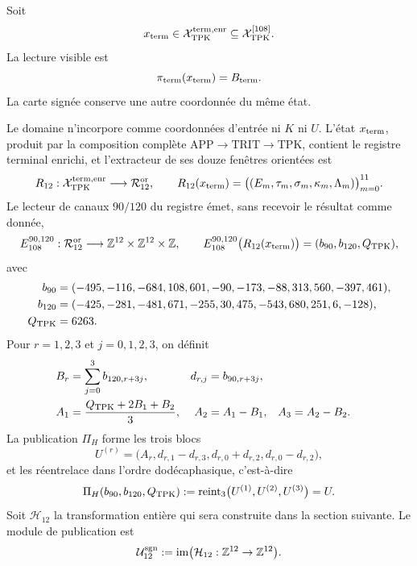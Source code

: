 Soit
\[
 x_{\rm term}\in
 \mathcal X_{\rm TPK}^{\rm term,enr}
 \subseteq\mathcal X_{\rm TPK}^{[108]}.
\]
La lecture visible est
\[
 \pi_{\rm term}(x_{\rm term})=B_{\rm term}.
\]
La carte signée conserve une autre coordonnée du même état.

\begin{definition}
\label{p3-83-c25-s4:def:subespacio-firmado-terminal}
Le domaine n’incorpore comme coordonnées d’entrée ni \(K\) ni \(U\).
L’état \(x_{\rm term}\), produit par la composition complète
\(\mathrm{APP}\to\mathrm{TRIT}\to\mathrm{TPK}\), contient le registre
terminal enrichi, et l’extracteur de ses douze fenêtres orientées est
\begin{equation}
 R_{12}:\mathcal X_{\rm TPK}^{\rm term,enr}
 \longrightarrow\mathcal R_{12}^{\rm or},
 \qquad
 R_{12}(x_{\rm term})
 =\bigl((E_m,\tau_m,\sigma_m,\kappa_m,\Lambda_m)\bigr)_{m=0}^{11}.
 \label{p3-83-c25-s4:eq:subespacio-firmado-terminal}
\end{equation}
Le lecteur de canaux \(90/120\) du registre émet, sans recevoir le résultat
comme donnée,
\[
 E_{108}^{90,120}:\mathcal R_{12}^{\rm or}
 \longrightarrow\mathbb Z^{12}\times\mathbb Z^{12}\times\mathbb Z,
 \qquad
 E_{108}^{90,120}\bigl(R_{12}(x_{\rm term})\bigr)
 =(b_{90},b_{120},Q_{\rm TPK}),
\]
avec
\begin{align*}
 b_{90}={}&(-495,-116,-684,108,601,-90,
             -173,-88,313,560,-397,461),\\
 b_{120}={}&(-425,-281,-481,671,-255,30,
              475,-543,680,251,6,-128),\\
 Q_{\rm TPK}={}&6263.
\end{align*}
Pour \(r=1,2,3\) et \(j=0,1,2,3\), on définit
\[
\begin{aligned}
 B_r&=\sum_{j=0}^{3}b_{120,r+3j},
 &d_{r,j}&=b_{90,r+3j},\\
 A_1&=\frac{Q_{\rm TPK}+2B_1+B_2}{3},
 &A_2&=A_1-B_1,
 &A_3&=A_2-B_2.
\end{aligned}
\]
La publication \(\Pi_H\) forme les trois blocs
\[
 U^{(r)}=
 \bigl(A_r,d_{r,1}-d_{r,3},d_{r,0}+d_{r,2},
 d_{r,0}-d_{r,2}\bigr),
\]
et les réentrelace dans l’ordre dodécaphasique, c’est-à-dire
\[
 \Pi_H(b_{90},b_{120},Q_{\rm TPK})
 :=\operatorname{reint}_3\bigl(U^{(1)},U^{(2)},U^{(3)}\bigr)=U.
\]
Soit \(\mathcal H_{12}\) la
transformation entière qui sera construite dans la section suivante. Le module
de publication est
\begin{equation}
 \mathcal U_{12}^{\rm sgn}
 :=\operatorname{im}
 \bigl(\mathcal H_{12}:\mathbb Z^{12}\to\mathbb Z^{12}\bigr).

\end{equation}
\end{definition}
